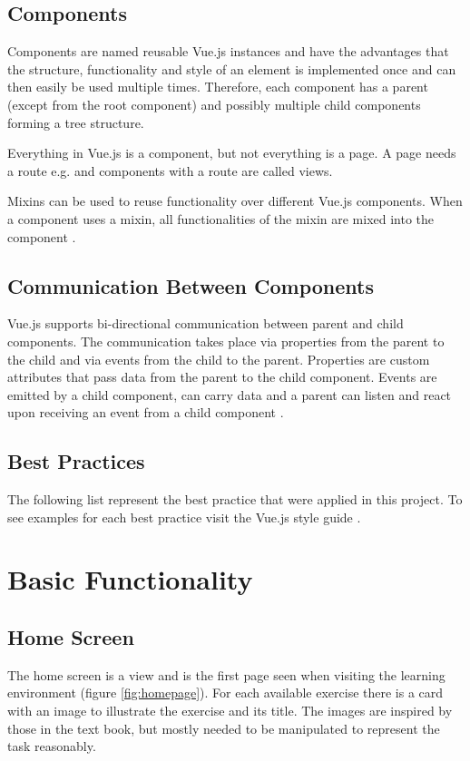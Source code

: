 \subsection{Components}
Components are named reusable Vue.js instances and have the advantages that the structure, functionality and style of an element is implemented once and can then easily be used multiple times. Therefore, each component has a parent (except from the root component) and possibly multiple child components forming a tree structure. 

Everything in Vue.js is a component, but not everything is a page. A page needs a route e.g.  and components with a route are called views. 

Mixins can be used to reuse functionality over different Vue.js components. When a component uses a mixin, all functionalities of the mixin are mixed into the component \cite{Vue}. 

\subsection{Communication Between Components}
Vue.js supports bi-directional communication between parent and child components. The communication takes place via properties from the parent to the child and via events from the child to the parent. Properties are custom attributes that pass data from the parent to the child component. Events are emitted by a child component, can carry data and a parent can listen and react upon receiving an event from a child component \cite{Vue}.

\subsection{Best Practices}
The following list represent the best practice that were applied in this project. To see examples for each best practice visit the Vue.js style guide  \cite{VueStyleGuide}.

\section{Basic Functionality}
\label{section:basicFunctionality}

\subsection{Home Screen}
The home screen is a view and is the first page seen when visiting the learning environment (figure \ref{fig:homepage}). For each available exercise there is a card with an image to illustrate the exercise and its title. The images are inspired by those in the text book, but mostly needed to be manipulated to represent the task reasonably.

